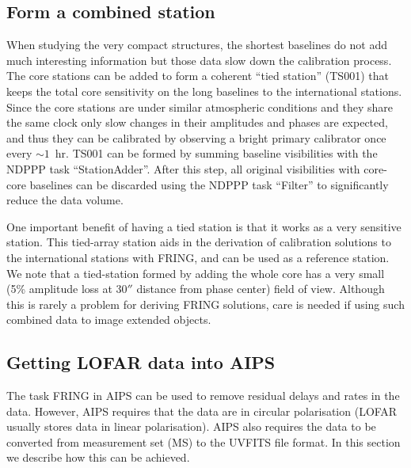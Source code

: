 \documentclass[graybox]{svmult}
\begin{document}
\subsection{Form a combined station}
\label{sect:ts001}
When studying the very compact structures, the shortest baselines do not add
much interesting information but those data slow down the calibration process.
The core stations can be added to form a coherent ``tied station'' (TS001) that
keeps the total core sensitivity on the long baselines to the international
stations.  Since the core stations are under similar atmospheric conditions and
they share the same clock only slow changes in their amplitudes and phases are
expected, and thus they can be calibrated by observing a bright primary
calibrator once every $\sim1$~hr. TS001 can be formed by summing baseline
visibilities with the NDPPP task ``StationAdder''.  After this step, all
original visibilities with core-core baselines can be discarded using the NDPPP
task ``Filter'' to significantly reduce the data volume.

One important benefit of having a tied station is that it works as a very
sensitive station. This tied-array station aids in the derivation of
calibration solutions to the international stations with FRING, and can be used
as a reference station. We note that a tied-station formed by adding the whole
core has a very small (5\% amplitude loss at 30$''$ distance from phase center)
field of view. Although this is rarely a problem for deriving FRING solutions,
care is needed if using such combined data to image extended objects.



\subsection{Getting LOFAR data into AIPS}
The task FRING in AIPS can be used to remove residual delays and rates in the
data. However, AIPS requires that the data are in circular polarisation (LOFAR
usually stores data in linear polarisation). AIPS also requires the
data to be converted from measurement set (MS) to the UVFITS file format.
In this section we describe how this can be achieved. 
\end{document}
